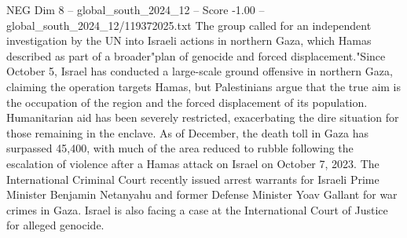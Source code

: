 \begin{textsample}{NEG Dim 8 – global\_south\_2024\_12 – Score -1.00 – global\_south\_2024\_12/119372025.txt}
The group called for an independent investigation by the UN into Israeli actions in northern Gaza, which Hamas described as part of a broader"plan of genocide and forced displacement."Since October 5, Israel has conducted a large-scale ground offensive in northern Gaza, claiming the operation targets Hamas, but Palestinians argue that the true aim is the occupation of the region and the forced displacement of its population.
Humanitarian aid has been severely restricted, exacerbating the dire situation for those remaining in the enclave.
As of December, the death toll in Gaza has surpassed 45,400, with much of the area reduced to rubble following the escalation of violence after a Hamas attack on Israel on October 7, 2023.
The International Criminal Court recently issued arrest warrants for Israeli Prime Minister Benjamin Netanyahu and former Defense Minister Yoav Gallant for war crimes in Gaza.
Israel is also facing a case at the International Court of Justice for alleged genocide.

\end{textsample}
